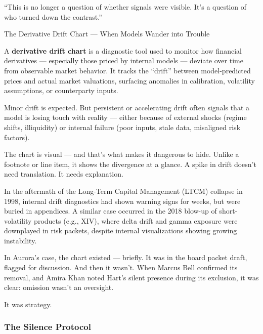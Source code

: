 “This is no longer a question of whether signals were visible.
It’s a question of who turned down the contrast.”

\medskip

\begin{TechnicalSidebar}{The Derivative Drift Chart — When Models Wander into Trouble}

  A \textbf{derivative drift chart} is a diagnostic tool used to monitor how financial derivatives 
  — especially those priced by internal models — deviate over time from observable market behavior. 
  It tracks the ``drift'' between model-predicted prices and actual market valuations, surfacing 
  anomalies in calibration, volatility assumptions, or counterparty inputs.

  \medskip
  
  Minor drift is expected. But persistent or accelerating drift often signals that a model is 
  losing touch with reality — either because of external shocks (regime shifts, illiquidity) or 
  internal failure (poor inputs, stale data, misaligned risk factors).

  \medskip
  
  The chart is visual — and that's what makes it dangerous to hide. Unlike a footnote or line item, 
  it shows the divergence at a glance. A spike in drift doesn’t need translation. It needs explanation.

  \medskip
  
  In the aftermath of the Long-Term Capital Management (LTCM) collapse in 1998, internal drift diagnostics 
  had shown warning signs for weeks, but were buried in appendices. A similar case occurred in the 2018 
  blow-up of short-volatility products (e.g., XIV), where delta drift and gamma exposure were downplayed 
  in risk packets, despite internal visualizations showing growing instability.

  \medskip
  
  In Aurora’s case, the chart existed — briefly. It was in the board packet draft, flagged for discussion. 
  And then it wasn’t. When Marcus Bell confirmed its removal, and Amira Khan noted Hart’s silent presence 
  during its exclusion, it was clear: omission wasn’t an oversight.

  \medskip
  
  It was strategy.
  
\end{TechnicalSidebar}

\medskip

\subsubsection{The Silence Protocol}

